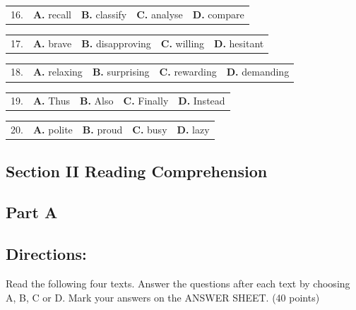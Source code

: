 \documentclass[UTF8,11pt]{ctexart}
\begin{document}
\noindent\begin{tabularx}{\linewidth}{@{}lXXXX@{}}16. & \textbf{A.} recall & \textbf{B.} classify & \textbf{C.} analyse & \textbf{D.} compare\\\end{tabularx}\par

\noindent\begin{tabularx}{\linewidth}{@{}lXXXX@{}}17. & \textbf{A.} brave & \textbf{B.} disapproving & \textbf{C.} willing & \textbf{D.} hesitant\\\end{tabularx}\par

\noindent\begin{tabularx}{\linewidth}{@{}lXXXX@{}}18. & \textbf{A.} relaxing & \textbf{B.} surprising & \textbf{C.} rewarding & \textbf{D.} demanding\\\end{tabularx}\par

\noindent\begin{tabularx}{\linewidth}{@{}lXXXX@{}}19. & \textbf{A.} Thus & \textbf{B.} Also & \textbf{C.} Finally & \textbf{D.} Instead\\\end{tabularx}\par

\noindent\begin{tabularx}{\linewidth}{@{}lXXXX@{}}20. & \textbf{A.} polite & \textbf{B.} proud & \textbf{C.} busy & \textbf{D.} lazy\\\end{tabularx}\par

\subsection*{\textbf{Section II Reading Comprehension}}


\subsection*{\textbf{Part A}}


\subsection*{\textbf{Directions:}}


Read the following four texts. Answer the questions after each text by choosing A, B, C or D. Mark your answers on the ANSWER SHEET. (40 points)
\end{document}
